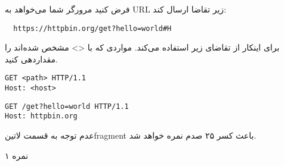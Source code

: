 
فرض کنید مرورگر شما می‌خواهد به URL زیر تقاضا ارسال کند:

\begin{latin}
\begin{verbatim}
  https://httpbin.org/get?hello=world#H
\end{verbatim}
\end{latin}

برای اینکار از تقاضای زیر استفاده می‌کند. مواردی که با <> مشخص شده‌اند را مقداردهی کنید.

\begin{latin}
\begin{verbatim}
GET <path> HTTP/1.1
Host: <host>
\end{verbatim}
\end{latin}


\begin{latin}
\begin{verbatim}
GET /get?hello=world HTTP/1.1
Host: httpbin.org
\end{verbatim}
\end{latin}

عدم توجه به قسمت ‌لاتین{fragment} باعث کسر ۲۵ صدم نمره خواهد شد.


۱ نمره
